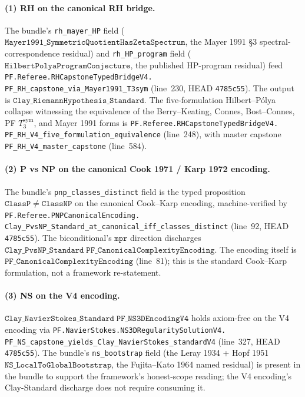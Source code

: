 \documentclass[11pt,a4paper]{article}
\theoremstyle{plain}
\theoremstyle{definition}
\begin{document}
\paragraph{(1) RH on the canonical RH bridge.}
The bundle's \texttt{rh\_mayer\_HP} field
($\mathtt{Mayer1991\_SymmetricQuotientHasZetaSpectrum}$, the
Mayer 1991 \S3 spectral-correspondence residual) and
\texttt{rh\_HP\_program} field
($\mathtt{HilbertPolyaProgramConjecture}$, the published HP-program
residual) feed
\texttt{PF.Referee.RHCapstoneTypedBridgeV4.\\
PF\_RH\_capstone\_via\_Mayer1991\_T3sym}
(line~230, HEAD \texttt{4785c55}). The output is
$\mathtt{Clay\_RiemannHypothesis\_Standard}$. The five-formulation
Hilbert--P\'olya collapse witnessing the equivalence of the
Berry--Keating, Connes, Bost--Connes, PF $T_3^{\mathrm{sym}}$, and
Mayer 1991 forms is
\texttt{PF.Referee.RHCapstoneTypedBridgeV4.\\
PF\_RH\_V4\_five\_formulation\_equivalence}
(line~248), with master capstone
\texttt{PF\_RH\_V4\_master\_capstone}
(line~584).

\paragraph{(2) P vs NP on the canonical Cook 1971 / Karp 1972
encoding.}
The bundle's \texttt{pnp\_classes\_distinct} field is the typed
proposition
$\mathtt{ClassP} \neq \mathtt{ClassNP}$ on the canonical
Cook--Karp encoding, machine-verified by
\texttt{PF.Referee.PNPCanonicalEncoding.\\
Clay\_PvsNP\_Standard\_at\_canonical\_iff\_classes\_distinct}
(line~92, HEAD \texttt{4785c55}). The biconditional's $\mathtt{mpr}$
direction discharges
$\mathtt{Clay\_PvsNP\_Standard\;PF\_CanonicalComplexityEncoding}$.
The encoding itself is $\mathtt{PF\_CanonicalComplexityEncoding}$
(line~81); this is the standard Cook--Karp formulation, not a
framework re-statement.

\paragraph{(3) NS on the V4 encoding.}
$\mathtt{Clay\_NavierStokes\_Standard\;PF\_NS3DEncodingV4}$ holds
axiom-free on the V4 encoding via
\texttt{PF.NavierStokes.NS3DRegularitySolutionV4.\\
PF\_NS\_capstone\_yields\_Clay\_NavierStokes\_standardV4}
(line~327, HEAD \texttt{4785c55}). The bundle's
\texttt{ns\_bootstrap} field (the Leray 1934 + Hopf 1951
$\mathtt{NS\_LocalToGlobalBootstrap}$, the Fujita--Kato 1964 named
residual) is present in the bundle to support the framework's
honest-scope reading; the V4 encoding's Clay-Standard discharge
does not require consuming it.
\end{document}
